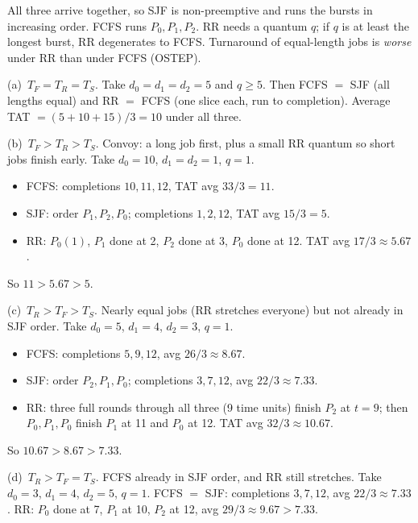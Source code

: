 \documentclass[11pt,a4paper]{article}
\newenvironment{Sol}{%
  \begin{tcolorbox}[sboxstyle, title={Solution}]%
}{%
  \end{tcolorbox}\vspace{0.35em}%
}
\begin{document}
\begin{Sol}
All three arrive together, so SJF is non-preemptive and runs the bursts in increasing order. FCFS runs $P_0,P_1,P_2$. RR needs a quantum $q$; if $q$ is at least the longest burst, RR degenerates to FCFS. Turnaround of equal-length jobs is \emph{worse} under RR than under FCFS (OSTEP).

(a)~$T_F=T_R=T_S$. Take $d_0=d_1=d_2=5$ and $q\ge 5$. Then FCFS $=$ SJF (all lengths equal) and RR $=$ FCFS (one slice each, run to completion). Average TAT $= (5+10+15)/3 = 10$ under all three.

(b)~$T_F > T_R > T_S$. Convoy: a long job first, plus a small RR quantum so short jobs finish early. Take $d_0=10$, $d_1=d_2=1$, $q=1$.
\begin{itemize}
  \item FCFS: completions $10,11,12$, TAT avg $33/3=11$.
  \item SJF: order $P_1,P_2,P_0$; completions $1,2,12$, TAT avg $15/3=5$.
  \item RR: $P_0(1)$, $P_1$ done at 2, $P_2$ done at 3, $P_0$ done at 12. TAT avg $17/3 \approx 5.67$.
\end{itemize}
So $11 > 5.67 > 5$.

(c)~$T_R > T_F > T_S$. Nearly equal jobs (RR stretches everyone) but not already in SJF order. Take $d_0=5$, $d_1=4$, $d_2=3$, $q=1$.
\begin{itemize}
  \item FCFS: completions $5,9,12$, avg $26/3 \approx 8.67$.
  \item SJF: order $P_2,P_1,P_0$; completions $3,7,12$, avg $22/3 \approx 7.33$.
  \item RR: three full rounds through all three (9 time units) finish $P_2$ at $t=9$; then $P_0,P_1,P_0$ finish $P_1$ at 11 and $P_0$ at 12. TAT avg $32/3 \approx 10.67$.
\end{itemize}
So $10.67 > 8.67 > 7.33$.

(d)~$T_R > T_F = T_S$. FCFS already in SJF order, and RR still stretches. Take $d_0=3$, $d_1=4$, $d_2=5$, $q=1$. FCFS $=$ SJF: completions $3,7,12$, avg $22/3 \approx 7.33$. RR: $P_0$ done at 7, $P_1$ at 10, $P_2$ at 12, avg $29/3 \approx 9.67 > 7.33$.
\end{Sol}
\end{document}
